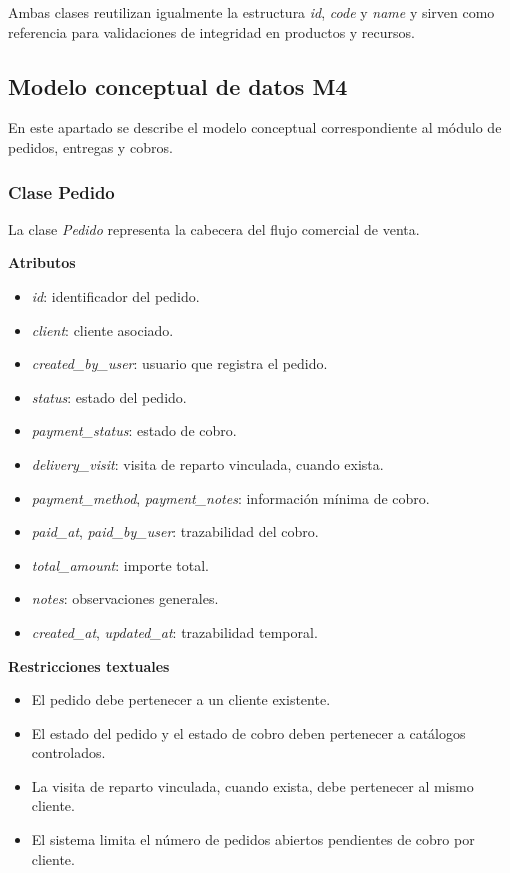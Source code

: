 Ambas clases reutilizan igualmente la estructura \textit{id}, \textit{code} y \textit{name} y sirven como referencia para validaciones de integridad en productos y recursos.

\subsection{Modelo conceptual de datos M4}

En este apartado se describe el modelo conceptual correspondiente al módulo de pedidos, entregas y cobros.

\subsubsection{Clase Pedido}

La clase \textit{Pedido} representa la cabecera del flujo comercial de venta.

\textbf{Atributos}

\begin{itemize}
      \item \textit{id}: identificador del pedido.
      \item \textit{client}: cliente asociado.
      \item \textit{created\_by\_user}: usuario que registra el pedido.
      \item \textit{status}: estado del pedido.
      \item \textit{payment\_status}: estado de cobro.
      \item \textit{delivery\_visit}: visita de reparto vinculada, cuando exista.
      \item \textit{payment\_method}, \textit{payment\_notes}: información mínima de cobro.
      \item \textit{paid\_at}, \textit{paid\_by\_user}: trazabilidad del cobro.
      \item \textit{total\_amount}: importe total.
      \item \textit{notes}: observaciones generales.
      \item \textit{created\_at}, \textit{updated\_at}: trazabilidad temporal.
\end{itemize}

\textbf{Restricciones textuales}

\begin{itemize}
      \item El pedido debe pertenecer a un cliente existente.
      \item El estado del pedido y el estado de cobro deben pertenecer a catálogos controlados.
      \item La visita de reparto vinculada, cuando exista, debe pertenecer al mismo cliente.
      \item El sistema limita el número de pedidos abiertos pendientes de cobro por cliente.
\end{itemize}


